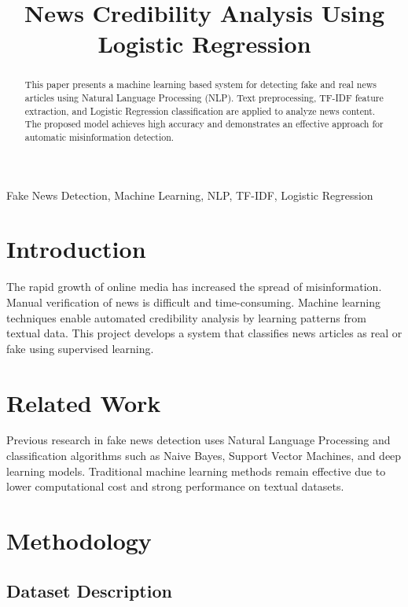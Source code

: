 \documentclass[conference]{IEEEtran}
\title{News Credibility Analysis Using Logistic Regression}
\author{
\IEEEauthorblockN{Team X}
\IEEEauthorblockA{
Advik Khandelwal, Sahil Kumar, Harsh Ahalawat, Meet Kumar
}
}
\begin{document}
\maketitle

\begin{abstract}
This paper presents a machine learning based system for detecting
fake and real news articles using Natural Language Processing (NLP).
Text preprocessing, TF-IDF feature extraction, and Logistic Regression
classification are applied to analyze news content. The proposed model
achieves high accuracy and demonstrates an effective approach for
automatic misinformation detection.
\end{abstract}

\begin{IEEEkeywords}
Fake News Detection, Machine Learning, NLP, TF-IDF, Logistic Regression
\end{IEEEkeywords}

\section{Introduction}

The rapid growth of online media has increased the spread of
misinformation. Manual verification of news is difficult and
time-consuming. Machine learning techniques enable automated
credibility analysis by learning patterns from textual data.
This project develops a system that classifies news articles
as real or fake using supervised learning.

\section{Related Work}

Previous research in fake news detection uses Natural Language
Processing and classification algorithms such as Naive Bayes,
Support Vector Machines, and deep learning models. Traditional
machine learning methods remain effective due to lower computational
cost and strong performance on textual datasets.

\section{Methodology}

\subsection{Dataset Description}
\end{document}
